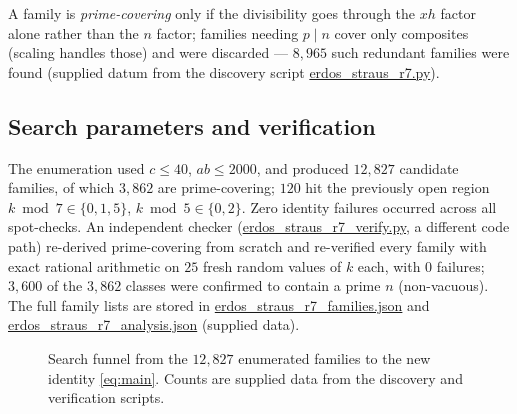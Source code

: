 \documentclass[11pt,a4paper]{article}
\theoremstyle{definition}
\begin{document}
A family is \emph{prime-covering} only if the divisibility goes through the
$xh$ factor alone rather than the $n$ factor; families needing $p \mid n$
cover only composites (scaling handles those) and were discarded ---
$8{,}965$ such redundant families were found (supplied datum from the
discovery script \url{erdos_straus_r7.py}).

\subsection{Search parameters and verification}

The enumeration used $c \leq 40$, $ab \leq 2000$, and produced $12{,}827$
candidate families, of which $3{,}862$ are prime-covering; $120$ hit the
previously open region $k \bmod 7 \in \{0,1,5\}$, $k \bmod 5 \in \{0,2\}$.
Zero identity failures occurred across all spot-checks. An independent
checker (\url{erdos_straus_r7_verify.py}, a different code path)
re-derived prime-covering from scratch and re-verified every family with
exact rational arithmetic on $25$ fresh random values of $k$ each, with
$0$ failures; $3{,}600$ of the $3{,}862$ classes were confirmed to contain
a prime $n$ (non-vacuous). The full family lists are stored in
\url{erdos_straus_r7_families.json} and
\url{erdos_straus_r7_analysis.json} (supplied data).

\begin{figure}[t]
  \centering
  \caption{Search funnel from the $12{,}827$ enumerated families to the new
    identity \eqref{eq:main}. Counts are supplied data from the discovery
    and verification scripts.}
  \label{fig:funnel}
\end{figure}
\end{document}
